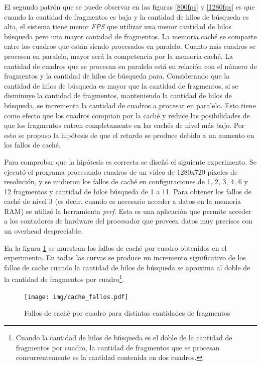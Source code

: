 El segundo patrón que se puede observar en las figuras \ref{800fps} y
\ref{1280fps} es que cuando la cantidad de fragmentos es baja y la cantidad de
hilos de búsqueda es alta, el sistema tiene menor \emph{FPS} que utilizar una
menor cantidad de hilos búsqueda pero una mayor cantidad de fragmentos. La
memoria caché se comparte entre los cuadros que están siendo procesados en
paralelo. Cuanto más cuadros se procesen en paralelo, mayor será la competencia
por la memoria caché. La cantidad de cuadros que se procesan en paralelo está en
relación con el número de fragmentos y la cantidad de hilos de búsqueda para.
Considerando que la cantidad de hilos de búsqueda es mayor
que la cantidad de fragmentos, si se disminuye la cantidad de fragmentos,
manteniendo la cantidad de hilos de búsqueda, se
incrementa la cantidad de cuadros a procesar en paralelo. Esto tiene como efecto
que los cuadros compitan por la caché y reduce las posibilidades de que los
fragmentos entren completamente en las cachés de nivel más bajo. Por esto se
propuso la hipótesis de que el retardo se produce debido a un aumento en los
fallos de caché.

Para comprobar que la hipótesis es correcta se diseñó el siguiente experimento.
Se ejecutó el programa procesando cuadros de un vídeo de 1280x720 píxeles de
resolución, y se midieron los fallos de caché en configuraciones de 1, 2, 3, 4,
6 y 12 fragmentos y cantidad de hilos búsqueda de 1 a 11. Para obtener los
fallos de caché de nivel 3 (es decir, cuando es necesario acceder a datos en la
memoria RAM) se utilizó la herramienta \emph{perf}. Esta es una aplicación que
permite acceder a los contadores de hardware del procesador que proveen datos
muy precisos con un overhead despreciable.

En la figura \ref{cacheFallos} se muestran los fallos de caché por cuadro
obtenidos en el experimento. En todas las curvas se produce un incremento
significativo de los fallos de cache cuando la cantidad de hilos de búsqueda se
aproxima al doble de la cantidad de fragmentos por cuadro\footnote{Cuando la
cantidad de hilos de búsqueda es el doble de la cantidad de fragmentos por
cuadro, la cantidad de fragmentos que se procesan concurrentemente es la
cantidad contenida en dos cuadros.}.

\begin{figure}[h]

	\texttt{[image: img/cache\_fallos.pdf]}
	\caption{Fallos de caché por cuadro para distintas cantidades de
	fragmentos}
	\label{cacheFallos}

\end{figure}

